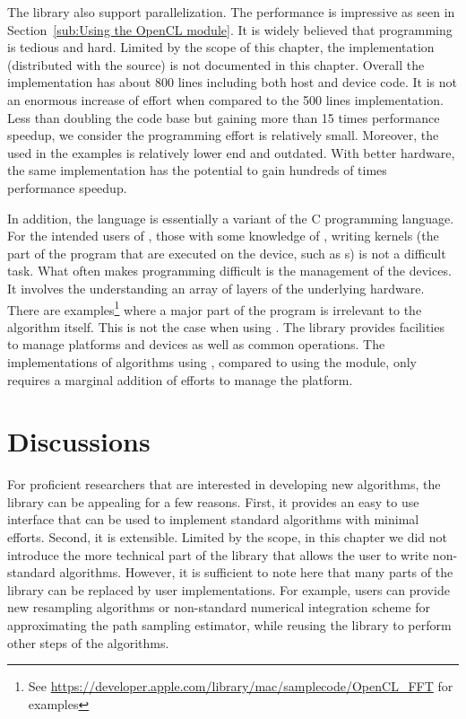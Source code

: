The library also support \opencl parallelization. The performance is impressive as seen in Section~\ref{sub:Using the OpenCL module}. It is widely believed that \opencl programming is tedious and hard. Limited by the scope of this chapter, the \opencl implementation (distributed with the \vsmc source) is not documented in this chapter. Overall the \opencl implementation has about 800 lines including both host and device code. It is not an enormous increase of effort when compared to the 500 lines \smp implementation. Less than doubling the code base but gaining more than 15 times performance speedup, we consider the programming effort is relatively small. Moreover, the \gpu used in the examples is relatively lower end and outdated. With better hardware, the same implementation has the potential to gain hundreds of times performance speedup.

In addition, the \opencl language is essentially a variant of the C programming language. For the intended users of \vsmc, those with some knowledge of \cpp, writing \opencl kernels (the part of the program that are executed on the device, such as \gpu{}s) is not a difficult task. What often makes \opencl programming difficult is the management of the devices. It involves the understanding an array of layers of the underlying hardware. There are examples\footnote{See \url{https://developer.apple.com/library/mac/samplecode/OpenCL_FFT} for examples} where a major part of the program is irrelevant to the algorithm itself. This is not the case when using \vsmc. The library provides facilities to manage \opencl platforms and devices as well as common operations. The implementations of \smc algorithms using \opencl, compared to using the \smp module, only requires a marginal addition of efforts to manage the \opencl platform.

\section{Discussions}
\label{sec:vSMC Discussion}

For \cpp proficient researchers that are interested in developing new algorithms, the \vsmc library can be appealing for a few reasons. First, it provides an easy to use interface that can be used to implement standard algorithms with minimal efforts. Second, it is extensible. Limited by the scope, in this chapter we did not introduce the more technical part of the library that allows the user to write non-standard algorithms. However, it is sufficient to note here that many parts of the library can be replaced by user implementations. For example, users can provide new resampling algorithms or non-standard numerical integration scheme for approximating the path sampling estimator, while reusing the library to perform other steps of the algorithms.

